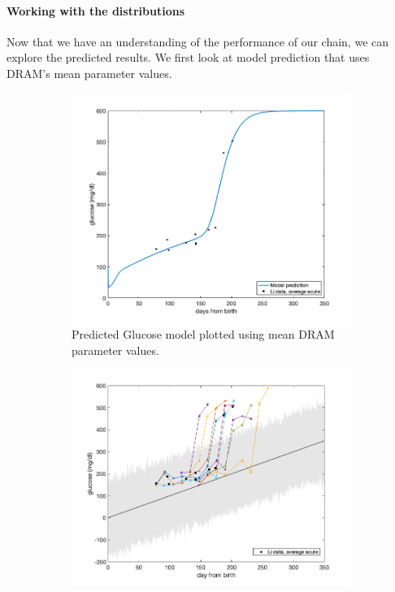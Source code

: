 \paragraph{Working with the distributions}
Now that we have an understanding of the performance of our chain, we can explore the predicted results. We first look at model prediction that uses DRAM's mean parameter values.
\begin{figure}[H]
\centering
\begin{subfigure}{.7\textwidth}
    \centering
    \includegraphics[width=1\linewidth]{MCMC_figs/dram_t1d_final/jul10_avg_run1(noIC)_acute_NOD_waveOn_lietal_meanpred.png}
    \caption{Predicted Glucose model plotted using mean DRAM parameter values.}
    \label{fig:17amcmc}
\end{subfigure}
\begin{subfigure}{.7\textwidth}
    \centering
    \includegraphics[width=1\linewidth]{MCMC_figs/dram_t1d_final/95_CI_avg.png}

\end{subfigure}
\end{figure}

